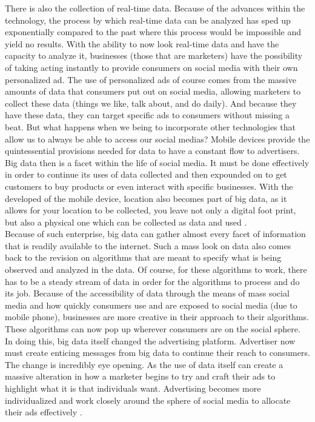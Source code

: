 \documentclass[sigconf]{acmart}
\begin{document}
There is also the collection of real-time data. Because of the advances within the technology, the process by which real-time data can be analyzed has sped up exponentially compared to the past where this process would be impossible and yield no results. With the ability to now look real-time data and have the capacity to analyze it, businesses (those that are marketers) have the possibility of taking acting instantly to provide consumers on social media with their own personalized ad. The use of personalized ads of course comes from the massive amounts of data that consumers put out on social media, allowing marketers to collect these data (things we like, talk about, and do daily). And because they have these data, they can target specific ads to consumers without missing a beat. But what happens when we being to incorporate other technologies that allow us to always be able to access our social medias? Mobile devices provide the quintessential provisions needed for data to have a constant flow to advertisers. Big data then is a facet within the life of social media. It must be done effectively in order to continue its uses of data collected and then expounded on to get customers to buy products or even interact with specific businesses. With the developed of the mobile device, location also becomes part of big data, as it allows for your location to be collected, you leave not only a digital foot print, but also a physical one which can be collected as data and used \cite{7}.\\

Because of such enterprise, big data can gather almost every facet of information that is readily available to the internet. Such a mass look on data also comes back to the revision on algorithms that are meant to specify what is being observed and analyzed in the data. Of course, for these algorithms to work, there has to be a steady stream of data in order for the algorithms to process and do its job. Because of the accessibility of data through the means of mass social media and how quickly consumers use and are exposed to social media (due to mobile phone), businesses are more creative in their approach to their algorithms. These algorithms can now pop up wherever consumers are on the social sphere. In doing this, big data itself changed the advertising platform. Advertiser now must create enticing messages from big data to continue their reach to consumers. The change is incredibly eye opening. As the use of data itself can create a massive alteration in how a marketer begins to try and craft their ads to highlight what it is that individuals want. Advertising becomes more individualized and work closely around the sphere of social media to allocate their ads effectively \cite{8}.\\
\end{document}
